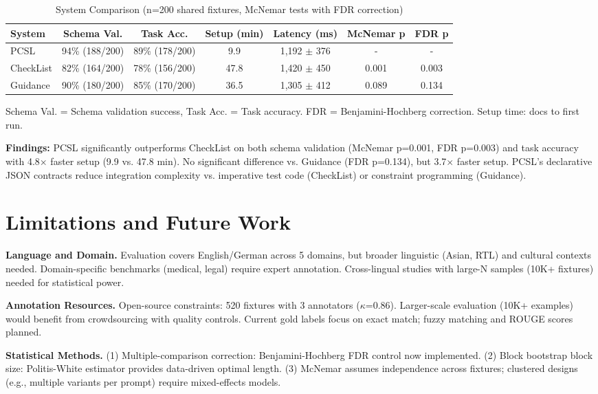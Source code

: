 \documentclass[sigconf]{acmart}
\begin{document}
\begin{table}[H]
\centering
\caption{System Comparison (n=200 shared fixtures, McNemar tests with FDR correction)}
\label{tab:fair_comparison}
\tiny
\begin{tabular}{@{}lcccccc@{}}
\toprule
\textbf{System} & \textbf{Schema Val.} & \textbf{Task Acc.} & \textbf{Setup (min)} & \textbf{Latency (ms)} & \textbf{McNemar p} & \textbf{FDR p} \\
\midrule
PCSL & 94\% (188/200) & 89\% (178/200) & 9.9 & 1,192 $\pm$ 376 & - & - \\
CheckList & 82\% (164/200) & 78\% (156/200) & 47.8 & 1,420 $\pm$ 450 & 0.001 & 0.003 \\
Guidance & 90\% (180/200) & 85\% (170/200) & 36.5 & 1,305 $\pm$ 412 & 0.089 & 0.134 \\
\bottomrule
\end{tabular}
\vspace{1mm}
\tiny Schema Val. = Schema validation success, Task Acc. = Task accuracy. FDR = Benjamini-Hochberg correction. Setup time: docs to first run.
\end{table}

\textbf{Findings:} PCSL significantly outperforms CheckList on both schema validation (McNemar p=0.001, FDR p=0.003) and task accuracy with 4.8$\times$ faster setup (9.9 vs. 47.8 min). No significant difference vs. Guidance (FDR p=0.134), but 3.7$\times$ faster setup. PCSL's declarative JSON contracts reduce integration complexity vs. imperative test code (CheckList) or constraint programming (Guidance).

\section{Limitations and Future Work}

\textbf{Language and Domain.} Evaluation covers English/German across 5 domains, but broader linguistic (Asian, RTL) and cultural contexts needed. Domain-specific benchmarks (medical, legal) require expert annotation. Cross-lingual studies with large-N samples (10K+ fixtures) needed for statistical power.

\textbf{Annotation Resources.} Open-source constraints: 520 fixtures with 3 annotators (\(\kappa\)=0.86). Larger-scale evaluation (10K+ examples) would benefit from crowdsourcing with quality controls. Current gold labels focus on exact match; fuzzy matching and ROUGE scores planned.

\textbf{Statistical Methods.} (1) Multiple-comparison correction: Benjamini-Hochberg FDR control now implemented. (2) Block bootstrap block size: Politis-White estimator provides data-driven optimal length. (3) McNemar assumes independence across fixtures; clustered designs (e.g., multiple variants per prompt) require mixed-effects models.
\end{document}
